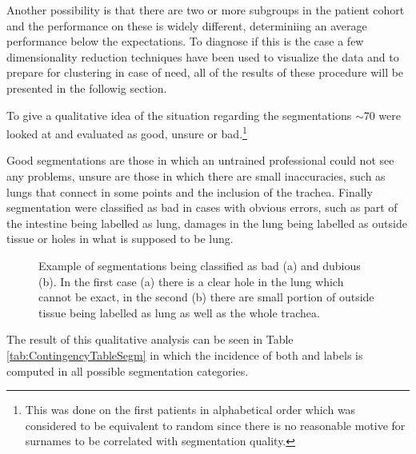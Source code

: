 Another possibility is that there are two or more subgroups in the patient cohort and the performance on these is widely different, determiniing an average performance below the expectations.
To diagnose if this is the case a few dimensionality reduction techniques have been used to visualize the data and to prepare for clustering in case of need, all of the results of these procedure will be presented in the followig section.	

To give a qualitative idea of the situation regarding the segmentations $\sim$70 were looked at and evaluated as good, unsure or bad.\footnote{This was done on the first patients in alphabetical order which was considered to be equivalent to random since there is no reasonable motive for surnames to be correlated with segmentation quality.}

Good segmentations are those in which an untrained professional could not see any problems, unsure are those in which there are small inaccuracies, such as lungs that connect in some points and the inclusion of the trachea. 
Finally segmentation were classified as bad in cases with obvious errors, such as part of the intestine being labelled as lung, damages in the lung being labelled as outside tissue or holes in what is supposed to be lung.

\begin{figure}[H]
\centering
	\newline
        \caption{Example of segmentations being classified as bad (a) and dubious (b). In the first case (a) there is a clear hole in the lung which cannot be exact, in the second (b) there are small portion of outside tissue being labelled as lung as well as the whole trachea.}\label{fig:ExampleSeg}
\end{figure}

The result of this qualitative analysis can be seen in Table \ref{tab:ContingencyTableSegm} in which the incidence of both \death and \icu labels is computed in all possible segmentation categories.

